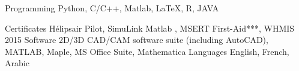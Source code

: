 

\begin{cvskills}

  \cvskill
    {Programming} %
    {Python, C/C++, Matlab, LaTeX, R, JAVA} %

  \cvskill
    {Certificates} %
    {Hélipsair Pilot, SimuLink Matlab , MSERT First-Aid***, WHMIS 2015} %
\cvskill
    {Software} %
    {2D/3D CAD/CAM software suite (including AutoCAD), MATLAB, Maple, MS Office Suite, Mathematica} %
  \cvskill
    {Languages} %
    {English, French, Arabic} %

\end{cvskills}
